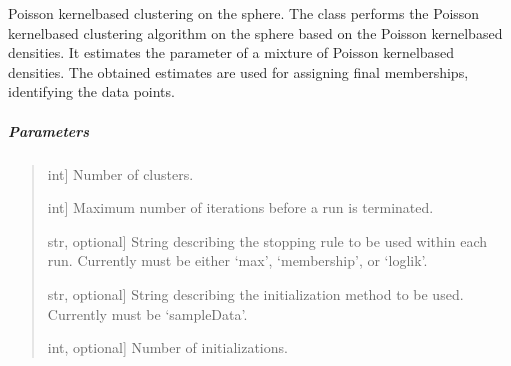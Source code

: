 \documentclass[letterpaper,10pt,english,openany,oneside]{sphinxmanual}
\begin{document}
\begin{fulllineitems}
\label{\detokenize{api_reference/generated/QuadratiK.spherical_clustering.PKBC:QuadratiK.spherical_clustering.PKBC}}
\pysigstartsignatures
{}
\pysigstopsignatures
\sphinxAtStartPar
Poisson kernel\sphinxhyphen{}based clustering on the sphere. 
The class performs the Poisson kernel\sphinxhyphen{}based clustering algorithm 
on the sphere based on the Poisson kernel\sphinxhyphen{}based densities. It estimates
the parameter of a mixture of Poisson kernel\sphinxhyphen{}based densities. The obtained
estimates are used for assigning final memberships, identifying the data points.


\subparagraph{Parameters}
\label{\detokenize{api_reference/generated/QuadratiK.spherical_clustering.PKBC:parameters}}\begin{quote}
\begin{description}
\sphinxlineitem{num\_clust}{[}int{]}
\sphinxAtStartPar
Number of clusters.

\sphinxlineitem{max\_iter}{[}int{]}
\sphinxAtStartPar
Maximum number of iterations before a run is terminated.

\sphinxlineitem{stopping\_rule}{[}str, optional{]}
\sphinxAtStartPar
String describing the stopping rule to be used within each run. 
Currently must be either ‘max’, ‘membership’, or ‘loglik’.

\sphinxlineitem{init\_method}{[}str, optional{]}
\sphinxAtStartPar
String describing the initialization method to be used. 
Currently must be ‘sampleData’.

\sphinxlineitem{num\_init}{[}int, optional{]}
\sphinxAtStartPar
Number of initializations.


\end{description}
\end{quote}
\end{fulllineitems}
\end{document}
